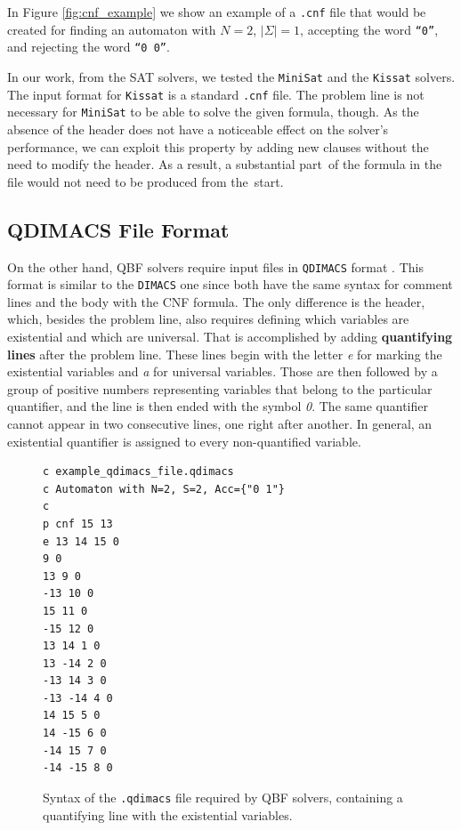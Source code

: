 In Figure \ref{fig:cnf_example} we show an example of a \verb|.cnf| file that would be created for finding an automaton with $N=2$, $|\Sigma|=1$, accepting the word \texttt{``0''}, and rejecting the word \texttt{``0 0''}.

In our work, from the SAT solvers, we tested the \texttt{MiniSat} and the \texttt{Kissat} solvers. The input format for \texttt{Kissat} is a standard \verb|.cnf| file. The problem line is not necessary for \texttt{MiniSat} to be able to solve the given formula, though. As the absence of the header does not have a noticeable effect on the solver's performance, we can exploit this property by adding new clauses without the need to modify the header. As a result, a substantial part of the formula in the file would not need to be produced from the start.

\pagebreak
\subsection{QDIMACS File Format}
On the other hand, QBF solvers require input files in \verb|QDIMACS| format \cite{QDIMACS_page}. This format is similar to the \verb|DIMACS| one since both have the same syntax for comment lines and the body with the CNF formula. The only difference is the header, which, besides the problem line, also requires defining which variables are existential and which are universal. That is accomplished by adding \textbf{quantifying lines} after the problem line. These lines begin with the letter \emph{e} for marking the existential variables and \emph{a} for universal variables. Those are then followed by a group of positive numbers representing variables that belong to the particular quantifier, and the line is then ended with the symbol  \emph{0}. The same quantifier cannot appear in two consecutive lines, one right after another. In general, an existential quantifier is assigned to every non-quantified variable. 

\begin{figure}[ht]
\label{fig:qdimacs_example}
\begin{verbatim}
c example_qdimacs_file.qdimacs
c Automaton with N=2, S=2, Acc={"0 1"}
c
p cnf 15 13
e 13 14 15 0
9 0
13 9 0
-13 10 0
15 11 0
-15 12 0
13 14 1 0
13 -14 2 0
-13 14 3 0
-13 -14 4 0
14 15 5 0
14 -15 6 0
-14 15 7 0
-14 -15 8 0
\end{verbatim}
\caption{Syntax of the \texttt{.qdimacs} file required by QBF solvers, containing a quantifying line with the existential variables.}
\end{figure}

